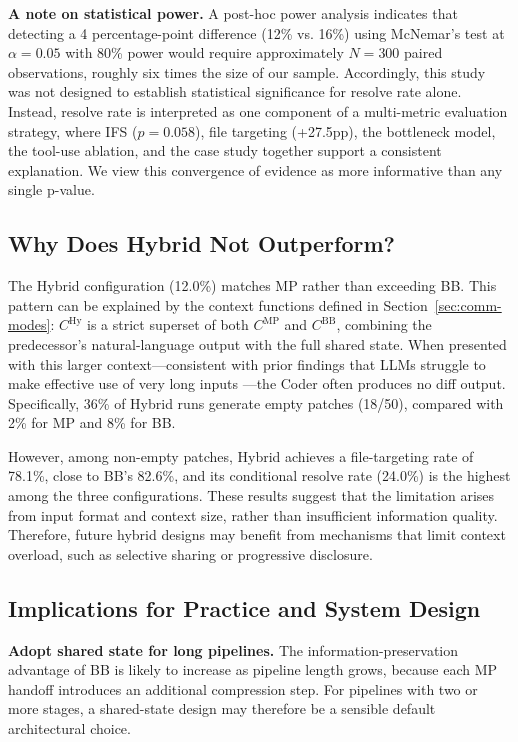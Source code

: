 \documentclass{ieeeaccess}
\begin{document}
\textbf{A note on statistical power.} A post-hoc power analysis indicates that detecting a 4 percentage-point difference (12\% vs. 16\%) using McNemar's test at $\alpha = 0.05$ with 80\% power would require approximately $N = 300$ paired observations, roughly six times the size of our sample. Accordingly, this study was not designed to establish statistical significance for resolve rate alone. Instead, resolve rate is interpreted as one component of a multi-metric evaluation strategy, where IFS ($p = 0.058$), file targeting (+27.5pp), the bottleneck model, the tool-use ablation, and the case study together support a consistent explanation. We view this convergence of evidence as more informative than any single p-value.

\subsection{Why Does Hybrid Not Outperform?}

The Hybrid configuration (12.0\%) matches MP rather than exceeding BB. This pattern can be explained by the context functions defined in Section~\ref{sec:comm-modes}: $C^{\text{Hy}}$ is a strict superset of both $C^{\text{MP}}$ and $C^{\text{BB}}$, combining the predecessor's natural-language output with the full shared state. When presented with this larger context---consistent with prior findings that LLMs struggle to make effective use of very long inputs \cite{liu2024lost}---the Coder often produces no diff output. Specifically, 36\% of Hybrid runs generate empty patches (18/50), compared with 2\% for MP and 8\% for BB.

However, among non-empty patches, Hybrid achieves a file-targeting rate of 78.1\%, close to BB's 82.6\%, and its conditional resolve rate (24.0\%) is the highest among the three configurations. These results suggest that the limitation arises from input format and context size, rather than insufficient information quality. Therefore, future hybrid designs may benefit from mechanisms that limit context overload, such as selective sharing or progressive disclosure.

\subsection{Implications for Practice and System Design}

\textbf{Adopt shared state for long pipelines.} The information-preservation advantage of BB is likely to increase as pipeline length grows, because each MP handoff introduces an additional compression step. For pipelines with two or more stages, a shared-state design may therefore be a sensible default architectural choice.
\end{document}

